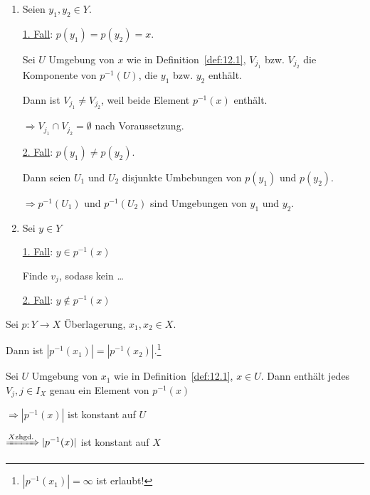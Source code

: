 \begin{beweis}
    \begin{enumerate}[label=\alph*)]
        \item Seien $y_1, y_2 \in Y$.

        \underline{1. Fall}: $p(y_1) = p(y_2) = x$.

        Sei $U$ Umgebung von $x$ wie in Definition~\ref{def:12.1},
        $V_{j_1}$ bzw. $V_{j_2}$ die Komponente von $p^{-1}(U)$, die
        $y_1$ bzw. $y_2$ enthält.

        Dann ist $V_{j_1} \neq V_{j_2}$, weil beide  Element $p^{-1}(x)$
        enthält.

        $\Rightarrow V_{j_1} \cap V_{j_2} = \emptyset$ nach Voraussetzung.

        \underline{2. Fall}: $p(y_1) \neq p(y_2)$.
        
        Dann seien $U_1$ und $U_2$ disjunkte Umbebungen von $p(y_1)$
        und $p(y_2)$.

        $\Rightarrow p^{-1}(U_1)$ und $p^{-1}(U_2)$ sind Umgebungen von
        $y_1$ und $y_2$.

        \item Sei $y \in Y$

        \underline{1. Fall}: $y \in p^{-1}(x)$

        Finde $v_j$, sodass kein \dots {}

        \underline{2. Fall}: $y \notin p^{-1}(x)$

    \end{enumerate}
\end{beweis}

\begin{korollar}%
    Sei $p: Y \rightarrow X$ Überlagerung, $x_1, x_2 \in X$.

    Dann ist $|p^{-1} (x_1)| = |p^{-1}(x_2)|$.\footnote{$|p^{-1} (x_1)| = \infty$ ist erlaubt!}
\end{korollar}

\begin{beweis}
    Sei $U$ Umgebung von $x_1$ wie in Definition~\ref{def:12.1}, $x \in U$.
    Dann enthält jedes $V_j, j \in I_X$ genau ein Element von
    $p^{-1}(x)$

    $\Rightarrow |p^{-1} (x)|$ ist konstant auf $U$

    $\xRightarrow{X \text{zhgd.}} |p^{-1}(x)|$  ist konstant auf $X$
\end{beweis}

